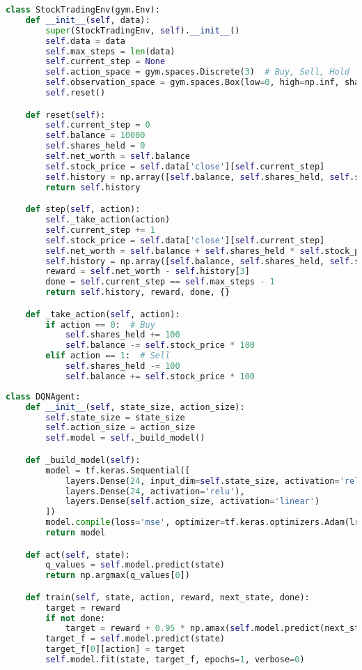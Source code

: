 \documentclass{article}
\begin{document}
\begin{lstlisting}[language=Python]
class StockTradingEnv(gym.Env):
    def __init__(self, data):
        super(StockTradingEnv, self).__init__()
        self.data = data
        self.max_steps = len(data)
        self.current_step = None
        self.action_space = gym.spaces.Discrete(3)  # Buy, Sell, Hold
        self.observation_space = gym.spaces.Box(low=0, high=np.inf, shape=(5,))
        self.reset()

    def reset(self):
        self.current_step = 0
        self.balance = 10000
        self.shares_held = 0
        self.net_worth = self.balance
        self.stock_price = self.data['close'][self.current_step]
        self.history = np.array([self.balance, self.shares_held, self.stock_price, 0, 0])
        return self.history

    def step(self, action):
        self._take_action(action)
        self.current_step += 1
        self.stock_price = self.data['close'][self.current_step]
        self.net_worth = self.balance + self.shares_held * self.stock_price
        self.history = np.array([self.balance, self.shares_held, self.stock_price, self.net_worth, action])
        reward = self.net_worth - self.history[3]
        done = self.current_step == self.max_steps - 1
        return self.history, reward, done, {}

    def _take_action(self, action):
        if action == 0:  # Buy
            self.shares_held += 100
            self.balance -= self.stock_price * 100
        elif action == 1:  # Sell
            self.shares_held -= 100
            self.balance += self.stock_price * 100
\end{lstlisting}

\begin{lstlisting}[language=Python]
class DQNAgent:
    def __init__(self, state_size, action_size):
        self.state_size = state_size
        self.action_size = action_size
        self.model = self._build_model()

    def _build_model(self):
        model = tf.keras.Sequential([
            layers.Dense(24, input_dim=self.state_size, activation='relu'),
            layers.Dense(24, activation='relu'),
            layers.Dense(self.action_size, activation='linear')
        ])
        model.compile(loss='mse', optimizer=tf.keras.optimizers.Adam(lr=0.001))
        return model

    def act(self, state):
        q_values = self.model.predict(state)
        return np.argmax(q_values[0])

    def train(self, state, action, reward, next_state, done):
        target = reward
        if not done:
            target = reward + 0.95 * np.amax(self.model.predict(next_state)[0])
        target_f = self.model.predict(state)
        target_f[0][action] = target
        self.model.fit(state, target_f, epochs=1, verbose=0)
\end{lstlisting}
\end{document}

